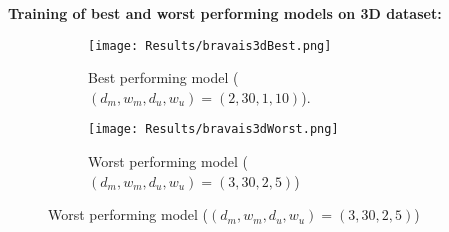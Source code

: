 \vspace*{-0.3cm}
\textbf{Training of best and worst performing models on 3D dataset:}
\begin{figure}
    \centering
    \begin{subfigure}[t]{0.49\textwidth}
        \centering
        \texttt{[image: Results/bravais3dBest.png]}
        \caption{Best performing model ($(d_m,w_m,d_u,w_u)=(2, 30, 1, 10)$).}
    \end{subfigure}
    \hfill
    \begin{subfigure}[t]{0.49\textwidth}
        \centering
        \texttt{[image: Results/bravais3dWorst.png]}
        \caption{Worst performing model ($(d_m,w_m,d_u,w_u)=(3, 30, 2, 5)$)}
    \end{subfigure}   
\end{figure}
